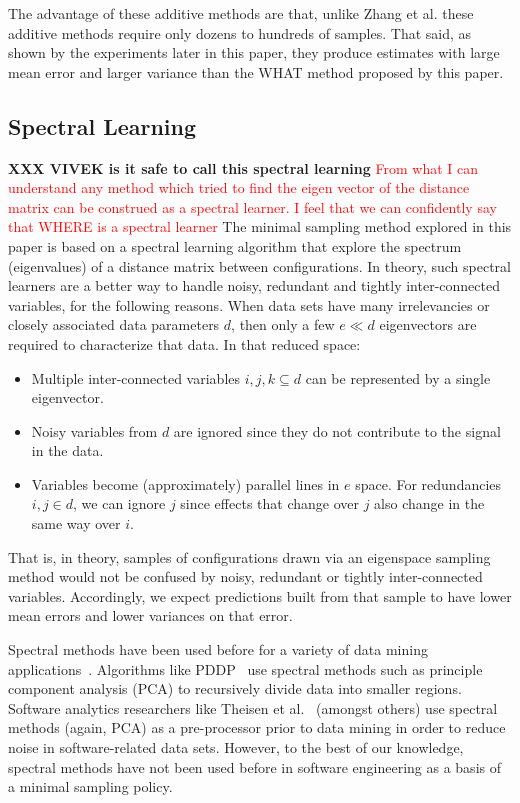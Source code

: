 \documentclass{sig-alternative}
\newcommand{\bi}{\begin{itemize}}%
\newcommand{\ei}{\end{itemize}}
\begin{document}
The advantage of these additive methods are that, unlike  Zhang et al. these additive methods require only dozens to hundreds of samples. That said, as shown by the experiments later in this
paper, they produce estimates with large mean error and larger variance than the WHAT method proposed by
this paper.
 

\subsection{Spectral Learning}\label{sect:spect}

{\bf XXX VIVEK is it safe to call this spectral learning}
\textcolor{red}{From what I can understand any method which tried to find the eigen vector of the distance matrix can be construed as a spectral learner. I feel that we can confidently say that WHERE is a spectral learner}
The minimal sampling method explored in this paper is based on a spectral learning algorithm
that  explore the spectrum (eigenvalues) of a distance matrix between  configurations.
In theory, such spectral learners are a better way to handle noisy, redundant and tightly inter-connected variables, for the following reasons.
When data sets have many irrelevancies   or closely associated data parameters $d$, then
only a few $e \ll d$ eigenvectors are required to characterize that data.
In that reduced space:
\bi
\item
Multiple inter-connected variables $i,j,k \subseteq d$ can be represented
by a single eigenvector.
\item
Noisy variables from $d$ are
ignored since they  do not contribute to the signal in the data.
\item
Variables  become (approximately) parallel lines
in $e$ space. For  redundancies \mbox{$i,j \in d$}, we
can ignore $j$
since effects that change over $j$ also
change in the same way over $i$.
\ei
That is, in theory, samples of configurations drawn via an eigenspace sampling method
would not be confused by noisy, redundant or tightly inter-connected variables. Accordingly,
we expect predictions built from that sample to have  lower mean errors and lower variances on that error.

Spectral methods have been used before for a variety of data mining applications~\cite{kamvar2003spectral}.
Algorithms like PDDP~\cite{boley98} use spectral methods such as principle component analysis (PCA) to
recursively divide data into smaller regions.  Software analytics researchers like Theisen et al.~\cite{Theisen15} (amongst
others) use spectral methods (again, PCA) as a pre-processor prior to data mining in order to reduce noise in software-related data sets.
However, to the best of our knowledge, spectral methods have not been used before in software engineering as a basis 
of a minimal sampling policy.
\end{document}
